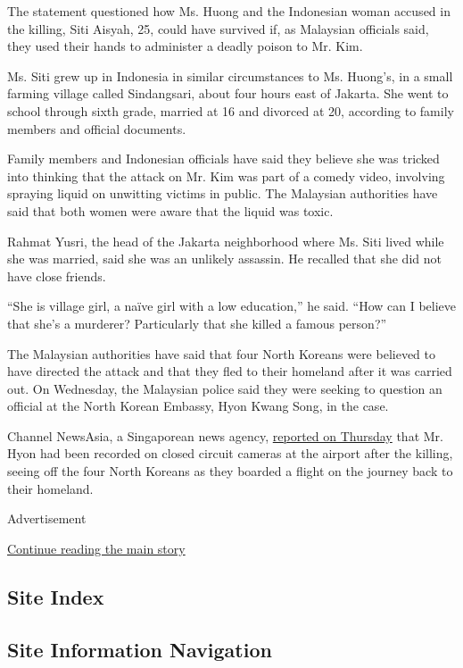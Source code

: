 The statement questioned how Ms. Huong and the Indonesian woman accused
in the killing, Siti Aisyah, 25, could have survived if, as Malaysian
officials said, they used their hands to administer a deadly poison to
Mr. Kim.

Ms. Siti grew up in Indonesia in similar circumstances to Ms. Huong's,
in a small farming village called Sindangsari, about four hours east of
Jakarta. She went to school through sixth grade, married at 16 and
divorced at 20, according to family members and official documents.

Family members and Indonesian officials have said they believe she was
tricked into thinking that the attack on Mr. Kim was part of a comedy
video, involving spraying liquid on unwitting victims in public. The
Malaysian authorities have said that both women were aware that the
liquid was toxic.

Rahmat Yusri, the head of the Jakarta neighborhood where Ms. Siti lived
while she was married, said she was an unlikely assassin. He recalled
that she did not have close friends.

``She is village girl, a naïve girl with a low education,'' he said.
``How can I believe that she's a murderer? Particularly that she killed
a famous person?''

The Malaysian authorities have said that four North Koreans were
believed to have directed the attack and that they fled to their
homeland after it was carried out. On Wednesday, the Malaysian police
said they were seeking to question an official at the North Korean
Embassy, Hyon Kwang Song, in the case.

Channel NewsAsia, a Singaporean news agency,
\href{http://www.channelnewsasia.com/news/asiapacific/north-korean-diplomat-allegedly-sent-off-kim-jong-nam-murder/3541734.html\#.WK44VNn8Hs4.twitter}{reported
on Thursday} that Mr. Hyon had been recorded on closed circuit cameras
at the airport after the killing, seeing off the four North Koreans as
they boarded a flight on the journey back to their homeland.

Advertisement

\protect\hyperlink{after-bottom}{Continue reading the main story}

\hypertarget{site-index}{%
\subsection{Site Index}\label{site-index}}

\hypertarget{site-information-navigation}{%
\subsection{Site Information
Navigation}\label{site-information-navigation}}

